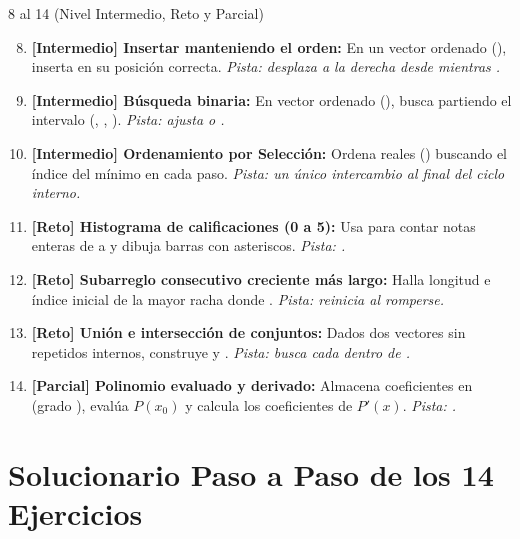 \documentclass[11pt,letterpaper]{article}
\begin{document}
\begin{ejercicio}{8 al 14 (Nivel Intermedio, Reto y Parcial)}
\begin{enumerate}
  \setcounter{enumi}{7}
  \item \textbf{[Intermedio] Insertar manteniendo el orden:} En un vector ordenado (), inserta  en su posición correcta. \emph{Pista: desplaza a la derecha desde  mientras .}
  \item \textbf{[Intermedio] Búsqueda binaria:} En vector ordenado (), busca  partiendo el intervalo (, , ). \emph{Pista: ajusta  o .}
  \item \textbf{[Intermedio] Ordenamiento por Selección:} Ordena  reales () buscando el índice del mínimo en cada paso. \emph{Pista: un único intercambio al final del ciclo interno.}
  \item \textbf{[Reto] Histograma de calificaciones (0 a 5):} Usa  para contar notas enteras de  a  y dibuja barras con asteriscos. \emph{Pista: .}
  \item \textbf{[Reto] Subarreglo consecutivo creciente más largo:} Halla longitud e índice inicial de la mayor racha donde . \emph{Pista: reinicia  al romperse.}
  \item \textbf{[Reto] Unión e intersección de conjuntos:} Dados dos vectores sin repetidos internos, construye  y . \emph{Pista: busca cada  dentro de .}
  \item \textbf{[Parcial] Polinomio evaluado y derivado:} Almacena coeficientes en  (grado ), evalúa $P(x_0)$ y calcula los coeficientes de $P'(x)$. \emph{Pista: .}
\end{enumerate}
\end{ejercicio}

\section{Solucionario Paso a Paso de los 14 Ejercicios}
\end{document}
